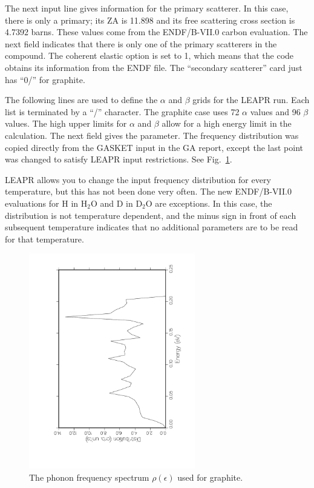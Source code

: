 The next input line gives information for the primary scatterer.
In this case, there is only a primary; its ZA is 11.898 and its
free scattering cross section is 4.7392 barns.  These values
come from the ENDF/B-VII.0 carbon evaluation.  The next field
indicates that there is only one of the primary scatterers in
the compound.  The coherent elastic option is set to 1, which
means that the code obtains its information from the ENDF file.
The ``secondary scatterer'' card just has ``0/'' for graphite.

The following lines are used to define the $\alpha$ and $\beta$ grids for
the LEAPR run.  Each list is terminated by a ``/'' character.  The graphite
case uses 72 $\alpha$ values and 96 $\beta$ values.  The high
upper limits for $\alpha$ and $\beta$ allow for a high energy limit
in the calculation.  The next field gives the  parameter.
The frequency distribution was copied directly from the GASKET input
 in the GA report, except the last point was changed to satisfy LEAPR
input restrictions.  See Fig.~\ref{graphr}.

LEAPR allows you to change the input frequency distribution
for every temperature, but this has not been done very often.
The new ENDF/B-VII.0 evaluations for H in H$_2$O and D in D$_2$O are
exceptions.  In this case, the distribution is not temperature dependent,
and the minus sign in front of each subsequent temperature
indicates that no additional parameters are to be read for
that temperature.

\begin{figure}[t]\centering
\includegraphics[keepaspectratio, height=3.7in, angle=270]{figs/leaack}
\caption[Graphite phonon frequency spectrum]{The phonon frequency
 spectrum $\rho(\epsilon)$ used for graphite.}
\label{graphr}
\end{figure}


